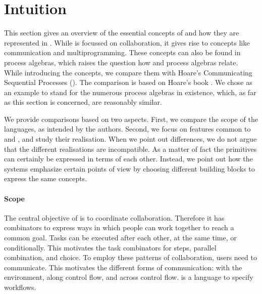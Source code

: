 


\section{Intuition}
\label{sec:comparison}

This section gives an overview of the essential concepts of \TOP and how they are represented in \TOPHAT.
While \TOP is focussed on collaboration, it gives rise to concepts like communication and multiprogramming.
These concepts can also be found in process algebras, which raises the question how \TOPHAT and process algebras relate.
While introducing the concepts, we compare them with Hoare's Communicating Sequential Processes (\CSP).
The comparison is based on Hoare's book \cite{books/Hoare85CSP}.
We chose \CSP as an example to stand for the numerous process algebras in existence, which, as far as this section is concerned, are reasonably similar.

We provide comparisons based on two aspects.
First, we compare the scope of the languages, as intended by the authors.
Second, we focus on features common to \TOP and \CSP, and study their realisation.
When we point out differences, we do not argue that the different realisations are incompatible.
As a matter of fact the primitives can certainly be expressed in terms of each other.
Instead, we point out how the systems emphasize certain points of view by choosing different building blocks to express the same concepts.



\paragraph{Scope}

The central objective of \TOP is to coordinate collaboration.
Therefore it has combinators to express ways in which people can work together to reach a common goal.
Tasks can be executed after each other, at the same time, or conditionally.
This motivates the task combinators for steps, parallel combination, and choice.
To employ these patterns of collaboration, users need to communicate.
This motivates the different forms of communication: with the environment, along control flow, and across control flow.
\TOPHAT is a language to specify workflows.

